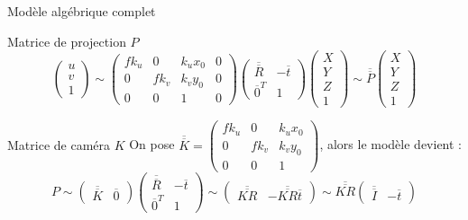 \documentclass[8pt]{beamer}
\begin{document}
	\begin{frame}{Modèle algébrique complet}
		\begin{block}{Matrice de projection $P$}
			$$
			\begin{pmatrix}
			u\\v\\1
			\end{pmatrix} \sim \begin{pmatrix}
			fk_u & 0 & k_ux_0 & 0\\0 & fk_v & k_vy_0 & 0\\0 & 0 & 1 & 0
			\end{pmatrix}\begin{pmatrix}
			\overline{\overline{R}} & -\overline{t}\\\overline{0}^T & 1
			\end{pmatrix}\begin{pmatrix}
			X\\Y\\Z\\1
			\end{pmatrix} \sim \overline{\overline{P}}\begin{pmatrix}
			X\\Y\\Z\\1
			\end{pmatrix}
			$$
		\end{block}
		\begin{block}{Matrice de caméra $K$}
			On pose $\overline{\overline{K}} = \begin{pmatrix}
			fk_u & 0 & k_ux_0\\0 & fk_v & k_vy_0\\0 & 0 & 1
			\end{pmatrix}$, alors le modèle devient :
			$$
			P \sim \begin{pmatrix}
			\overline{\overline{K}} & \overline{0}
			\end{pmatrix}\begin{pmatrix}
			\overline{\overline{R}} & -\overline{t}\\\overline{0}^T & 1
			\end{pmatrix}
			\sim \begin{pmatrix}
			\overline{\overline{KR}} & -\overline{\overline{KR}}\overline{t}
			\end{pmatrix}
			\sim \overline{\overline{KR}}\begin{pmatrix}
			\overline{\overline{I}} & -\overline{t}
			\end{pmatrix}
			$$
		\end{block}

\end{frame}
\end{document}
